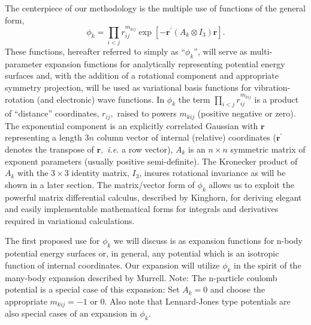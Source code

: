 \documentclass[12pt,thmsa]{article}
\begin{document}
The centerpiece of our methodology is the multiple use of functions of the
general form, 
\begin{equation}
\phi _k=\prod_{i<j}r_{ij}^{m_{kij}}\exp \left[ -\mathbf{r}^{\prime
}(A_k\otimes I_3)\mathbf{r}\right] .  \label{basisfcn}
\end{equation}
These functions, hereafter referred to simply as ``$\phi _k$'', will serve
as multi-parameter expansion functions for analytically representing
potential energy surfaces and, with the addition of a rotational component
and appropriate symmetry projection, will be used as variational basis
functions for vibration-rotation (and electronic) wave functions. In $\phi _k
$ the term $\prod_{i<j}r_{ij}^{m_{kij}}$ is a product of ``distance''
coordinates, $r_{ij},$ raised to powers $m_{kij}$ (positive negative or
zero). The exponential component is an explicitly correlated Gaussian with $%
\mathbf{r}$ representing a length $3n$ column vector of internal (relative)
coordinates ($\mathbf{r}^{\prime }$ denotes the transpose of $\mathbf{r,}$ 
\textit{i.e.} a row vector), $A_k$ is an $n\times n$ symmetric matrix of
exponent parameters (usually positive semi-definite). The Kronecker product
of $A_k$ with the $3\times 3$ identity matrix, $I_3$, insures rotational
invariance as will be shown in a later section. The matrix/vector form of $%
\phi _k$ allows us to exploit the powerful matrix differential calculus,
described by Kinghorn\cite{Kinghorn95a}, for deriving elegant and easily
implementable mathematical forms for integrals and derivatives required in
variational calculations.

The first proposed use for $\phi _k$ we will discuss is as expansion
functions for n-body potential energy surfaces or, in general, any potential
which is an isotropic function of internal coordinates. Our expansion will
utilize $\phi _k$ in the spirit of the many-body expansion described by
Murrell\cite{Murrell84}. Note: The n-particle coulomb potential is a special
case of this expansion: Set $A_k=0$ and choose the appropriate $m_{kij}=-1$%
or $0$. Also note that Lennard-Jones type potentials are also special cases
of an expansion in $\phi _k.$
\end{document}
